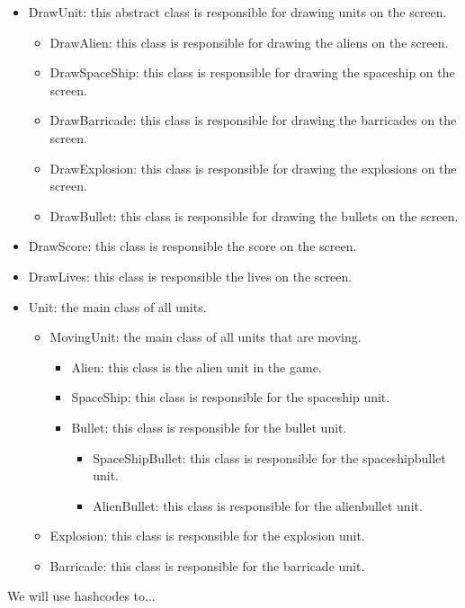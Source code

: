 \documentclass[10pt]{article}
\begin{document}
\begin{itemize}
	\item DrawUnit: this abstract class is responsible for drawing units on the screen.
	\begin{itemize}
		\item DrawAlien: this class is responsible for drawing the aliens on the screen.
		\item DrawSpaceShip: this class is responsible for drawing the spaceship on the screen.
		\item DrawBarricade: this class is responsible for drawing the barricades on the screen.
		\item DrawExplosion: this class is responsible for drawing the explosions on the screen.
		\item DrawBullet: this class is responsible for drawing the bullets on the screen.
	\end{itemize}
	\item DrawScore: this class is responsible the score on the screen.
	\item DrawLives: this class is responsible the lives on the screen.
\end{itemize}
\begin{itemize}
\item Unit: the main class of all units.
\begin{itemize}
\item MovingUnit: the main class of all units that are moving.
\begin{itemize}
\item Alien: this class is the alien unit in the game.
\item SpaceShip: this class is responsible for the spaceship unit.
\item Bullet: this class is responsible for the bullet unit.
\begin{itemize}
\item SpaceShipBullet: this class is responsible for the spaceshipbullet unit.
\item AlienBullet: this class is responsible for the alienbullet unit.
\end{itemize}
\end{itemize}
\item Explosion: this class is responsible for the explosion unit.
\item Barricade: this class is responsible for the barricade unit.
\end{itemize}
\end{itemize}
	
We will use hashcodes to...
\end{document}

